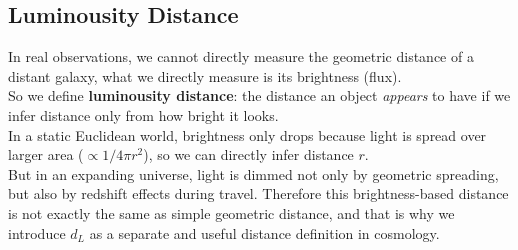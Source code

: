 \subsection{Luminousity Distance}
\begin{intuition}
    In real observations, we cannot directly measure the geometric distance of a distant galaxy, what we directly measure is its brightness (flux). \\

    So we define \textbf{luminousity distance}: the distance an object \emph{appears} to have if we infer distance only from how bright it looks. \\

    In a static Euclidean world, brightness only drops because light is spread over larger area ($\propto 1/4\pi r^2$), so we can directly infer distance $r$. \\

    But in an expanding universe, light is dimmed not only by geometric spreading, but also by redshift effects during travel. Therefore this brightness-based distance is not exactly the same as simple geometric distance, and that is why we introduce $d_L$ as a separate and useful distance definition in cosmology.
\end{intuition}

